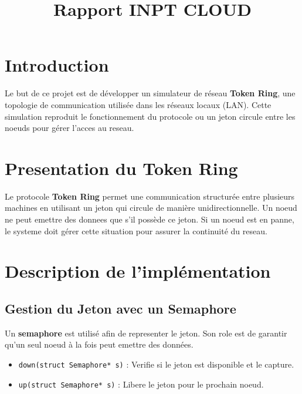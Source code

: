 \documentclass{rapportINPTCLOUD}
\title{Rapport INPT CLOUD} %
\begin{document}




        
\fairemarges %
\fairepagedegarde %
\tabledematieres %




\section{Introduction}
Le but de ce projet est de développer un simulateur de réseau \textbf{Token Ring}, une topologie de communication utilisée dans les réseaux locaux (LAN). Cette simulation reproduit le fonctionnement du protocole ou un jeton circule entre les noeuds pour gérer l'acces au reseau.

\section{Presentation du Token Ring}
Le protocole \textbf{Token Ring} permet une communication structurée entre plusieurs machines en utilisant un jeton qui circule de manière unidirectionnelle. Un noeud ne peut emettre des donnees que s’il possède ce jeton. Si un noeud est en panne, le systeme doit gérer cette situation pour assurer la continuité du reseau.

\section{Description de l’implémentation}

\subsection{Gestion du Jeton avec un Semaphore}
Un \textbf{semaphore} est utilisé afin de representer le jeton. Son role est de garantir qu’un seul noeud à la fois peut emettre des données.  
\begin{itemize}
    \item \texttt{down(struct Semaphore* s)} : Verifie si le jeton est disponible et le capture.
    \item \texttt{up(struct Semaphore* s)} : Libere le jeton pour le prochain noeud.
\end{itemize}
\end{document}
